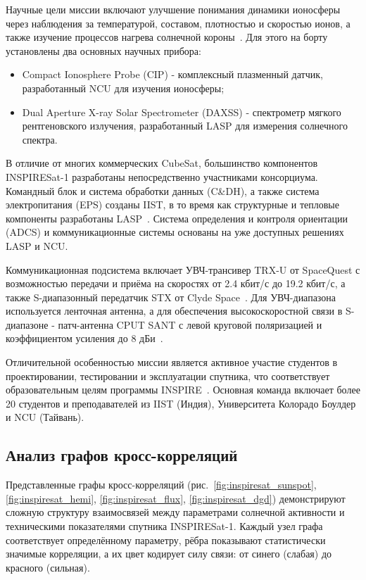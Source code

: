Научные цели миссии включают улучшение понимания динамики ионосферы через
наблюдения за температурой, составом, плотностью и скоростью ионов, а также
изучение процессов нагрева солнечной короны~\cite{eoportal_inspiresat,
	satnogs_inspiresat}. Для этого на борту установлены два основных научных
прибора:

\begin{itemize}
	\item Compact Ionosphere Probe (CIP) - комплексный плазменный датчик,
	      разработанный NCU для изучения ионосферы;
	\item Dual Aperture X-ray Solar Spectrometer (DAXSS) - спектрометр мягкого
	      рентгеновского излучения, разработанный LASP для измерения солнечного
	      спектра.
\end{itemize}

В отличие от многих коммерческих CubeSat, большинство компонентов INSPIRESat-1
разработаны непосредственно участниками консорциума. Командный блок и система
обработки данных (C\&DH), а также система электропитания (EPS) созданы IIST, в
то время как структурные и тепловые компоненты разработаны
LASP~\cite{core_inspiresat}. Система определения и контроля ориентации (ADCS) и
коммуникационные системы основаны на уже доступных решениях LASP и NCU.

Коммуникационная подсистема включает УВЧ-трансивер TRX-U от SpaceQuest с
возможностью передачи и приёма на скоростях от 2.4 кбит/с до 19.2 кбит/с, а
также S-диапазонный передатчик STX от Clyde Space~\cite{core_inspiresat}. Для
УВЧ-диапазона используется ленточная антенна, а для обеспечения высокоскоростной
связи в S-диапазоне - патч-антенна CPUT SANT с левой круговой поляризацией и
коэффициентом усиления до 8 дБи~\cite{core_inspiresat}.

Отличительной особенностью миссии является активное участие студентов в
проектировании, тестировании и эксплуатации спутника, что соответствует
образовательным целям программы INSPIRE~\cite{nanosats_inspiresat,
	satnogs_inspiresat}. Основная команда включает более 20 студентов и
преподавателей из IIST (Индия), Университета Колорадо Боулдер и NCU (Тайвань).

\subsection{Анализ графов кросс-корреляций}

Представленные графы кросс-корреляций
(рис.~\ref{fig:inspiresat_sunspot},
\ref{fig:inspiresat_hemi},
\ref{fig:inspiresat_flux},
\ref{fig:inspiresat_dgd})
демонстрируют сложную структуру взаимосвязей между параметрами солнечной
активности и техническими показателями спутника INSPIRESat-1. Каждый узел графа
соответствует определённому параметру, рёбра показывают статистически значимые
корреляции, а их цвет кодирует силу связи: от синего (слабая) до красного
(сильная).


